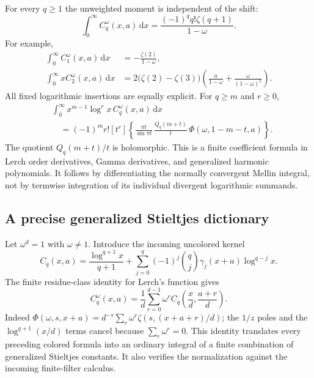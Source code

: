 \documentclass[11pt,a4paper]{article}
\numberwithin{equation}{section}
\theoremstyle{definition}
\theoremstyle{remark}
\newcommand{\dd}{\,\mathrm d}
\begin{document}
For every $q\ge1$ the unweighted moment is independent of the shift:
\begin{equation}\label{col:unweighted}
 \boxed{\displaystyle
 \int_0^\infty C_q^\omega(x,a)\dd x
       =\frac{(-1)^q q!\zeta(q+1)}{1-\omega}.}
\end{equation}
For example,
\begin{align}
 \int_0^\infty C_1^\omega(x,a)\dd x
      &=-\frac{\zeta(2)}{1-\omega},\label{col:first}\\
 \int_0^\infty xC_2^\omega(x,a)\dd x
      &=2\bigl(\zeta(2)-\zeta(3)\bigr)
         \left(\frac{a}{1-\omega}
                    +\frac{\omega}{(1-\omega)^2}\right).
 \label{col:second}
\end{align}
All fixed logarithmic insertions are equally explicit. For $q\ge m$
and $r\ge0$,
\begin{equation}\label{col:log-moments}
\begin{split}
 &\int_0^\infty x^{m-1}\log^r x\,C_q^\omega(x,a)\dd x\\
 &\quad=(-1)^m r![t^r]\left\{
   \frac{\pi t}{\sin\pi t}\,
   \frac{Q_q(m+t)}t\,\Phi(\omega,1-m-t,a)\right\}.
\end{split}
\end{equation}
The quotient $Q_q(m+t)/t$ is holomorphic. This is a finite coefficient
formula in Lerch order derivatives, Gamma derivatives, and generalized
harmonic polynomials. It follows by differentiating the normally
convergent Mellin integral, not by termwise integration of its
individual divergent logarithmic summands.

\subsection{A precise generalized Stieltjes dictionary}

Let $\omega^d=1$ with $\omega\ne1$. Introduce the incoming uncolored
kernel \cite{repobalanced}
\begin{equation}\label{col:uncolored}
 C_q(x,a)=\frac{\log^{q+1}x}{q+1}
       +\sum_{j=0}^q(-1)^j\binom qj
                  \gamma_j(x+a)\log^{q-j}x.
\end{equation}
The finite residue-class identity for Lerch's function gives
\begin{equation}\label{col:stieltjes-dictionary}
 \boxed{\displaystyle
 C_q^\omega(x,a)=\frac1d\sum_{r=0}^{d-1}
       \omega^r C_q\!\left(\frac xd,\frac{a+r}{d}\right).}
\end{equation}
Indeed
$\Phi(\omega,s,x+a)=d^{-s}\sum_r\omega^r
\zeta(s,(x+a+r)/d)$; the $1/z$ poles and the
$\log^{q+1}(x/d)$ terms cancel because $\sum_r\omega^r=0$.
This identity translates every preceding colored formula into an
ordinary integral of a finite combination of generalized Stieltjes
constants. It also verifies the normalization against the incoming
finite-filter calculus.
\end{document}
